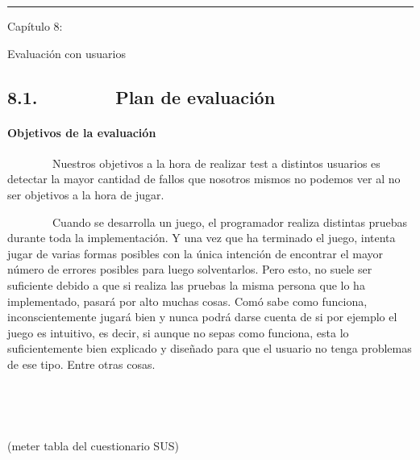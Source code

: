 \begin{center}\rule{3in}{0.4pt}\end{center}

Capítulo 8:

Evaluación con usuarios

\subsection{8.1.~~~~~~~~Plan de evaluación}\label{plan-de-evaluaciuxf3n}

\paragraph{Objetivos de la evaluación}\label{h.3l4e42ltrrrz}

~~~~~~~~Nuestros objetivos a la hora de realizar test a distintos
usuarios es detectar la mayor cantidad de fallos que nosotros mismos no
podemos ver al no ser objetivos a la hora de jugar.

~~~~~~~~Cuando se desarrolla un juego, el programador realiza distintas
pruebas durante toda la implementación. Y una vez que ha terminado el
juego, intenta jugar de varias formas posibles con la única intención de
encontrar el mayor número de errores posibles para luego solventarlos.
Pero esto, no suele ser suficiente debido a que si realiza las pruebas
la misma persona que lo ha implementado, pasará por alto muchas cosas.
Comó sabe como funciona, inconscientemente jugará bien y nunca podrá
darse cuenta de si por ejemplo el juego es intuitivo, es decir, si
aunque no sepas como funciona, esta lo suficientemente bien explicado y
diseñado para que el usuario no tenga problemas de ese tipo. Entre otras
cosas.

~~~~~~~~

~


(meter tabla del cuestionario SUS)



